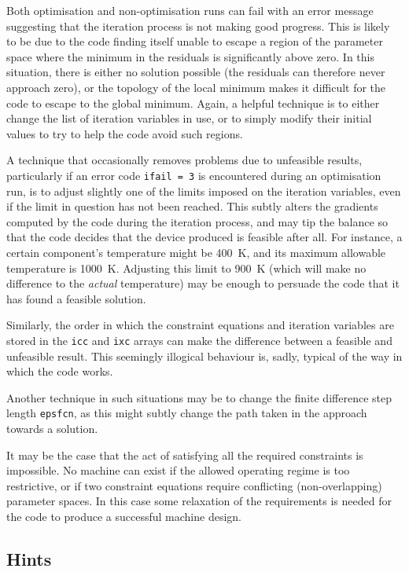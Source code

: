 \documentclass[11pt,a4paper]{report}
\begin{document}
Both optimisation and non-optimisation runs can fail with an error message
suggesting that the iteration process is not making good progress. This is
likely to be due to the code finding itself unable to escape a region of the
parameter space where the minimum in the residuals is significantly above
zero. In this situation, there is either no solution possible (the residuals
can therefore never approach zero), or the topology of the local minimum makes
it difficult for the code to escape to the global minimum. Again, a helpful
technique is to either change the list of iteration variables in use, or to
simply modify their initial values to try to help the code avoid such regions.

A technique that occasionally removes problems due to unfeasible results,
particularly if an error code \texttt{ifail = 3} is encountered during an
optimisation run, is to adjust slightly one of the limits imposed on the
iteration variables, even if the limit in question has not been reached. This
subtly alters the gradients computed by the code during the iteration process,
and may tip the balance so that the code decides that the device produced is
feasible after all. For instance, a certain component's temperature might be
400~K, and its maximum allowable temperature is 1000~K\@. Adjusting this limit
to 900~K (which will make no difference to the \textit{actual}\/ temperature)
may be enough to persuade the code that it has found a feasible solution.

Similarly, the order in which the constraint equations and iteration variables
are stored in the \texttt{icc} and \texttt{ixc} arrays can make the difference
between a feasible and unfeasible result. This seemingly illogical behaviour
is, sadly, typical of the way in which the code works.

Another technique in such situations may be to change the finite difference
step length \texttt{epsfcn}, as this might subtly change the path taken in the
approach towards a solution.

It may be the case that the act of satisfying all the required constraints is
impossible. No machine can exist if the allowed operating regime is too
restrictive, or if two constraint equations require conflicting
(non-overlapping) parameter spaces. In this case some relaxation of the
requirements is needed for the code to produce a successful machine design.

\subsection{Hints}
\end{document}
